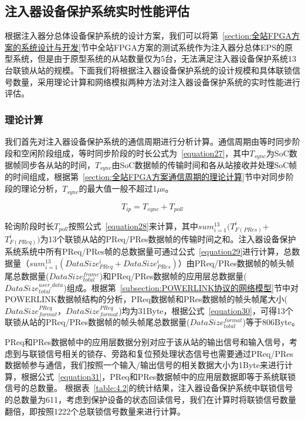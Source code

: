 \subsection{注入器设备保护系统实时性能评估}

根据注入器分总体设备保护系统的设计方案，我们可以将第~\ref{section:全站FPGA方案的系统设计与开发}节中全站FPGA方案的测试系统作为注入器分总体EPS的原型系统，但是由于原型系统的从站数量仅为5台，无法满足注入器设备保护系统13台联锁从站的规模。下面我们将根据注入器设备保护系统的设计规模和具体联锁信号数量，采用理论计算和网络模拟两种方法对注入器设备保护系统的实时性能进行评估。

\subsubsection{理论计算}

我们首先对注入器设备保护系统的通信周期进行分析计算。通信周期由等时同步阶段和空闲阶段组成，等时同步阶段的时长公式为~\ref{equation27}，其中$T_{sync}$为SoC数据帧同步各从站的时间，$T_{sync}$由SoC数据帧的传输时间和各从站接收并处理SoC帧的时间组成，根据第~\ref{section:全站FPGA方案通信周期的理论计算}节中对同步阶段的理论分析，$T_{sync}$的最大值一般不超过1$\mu$s。

\begin{equation}
\label{equation27}
T_{ip}=T_{sync}+T_{poll}
\end{equation}

轮询阶段时长$T_{poll}$按照公式~\ref{equation28}来计算，其中$sum_{i=1}^{13}(T_{F(PRes)}^{i}$+$T_{F(PReq)}^{i})$为13个联锁从站的PReq/PRes数据帧的传输时间之和。注入器设备保护系统系统中所有PReq/PRes帧的总数据量可通过公式~\ref{equation29}进行计算，总数据量（$sum_{i=1}^{13}(DataSize_{PReq}^{i}+DataSize_{PRes}^{i})$）由PReq/PRes数据帧的帧头帧尾总数据量($DataSize_{total}^{frame}$)和PReq/PRes数据帧的应用层总数据量($DataSize_{total}^{user\_data}$)组成。根据第~\ref{subsection:POWERLINK协议的网络模型}节中对POWERLINK数据帧结构的分析，PReq数据帧和PRes数据帧的帧头帧尾大小($DataSize_{format}^{PReq}$，$DataSize_{format}^{PReq}$)均为31Byte，根据公式~\ref{equation30}，可得13个联锁从站的PReq/PRes数据帧的帧头帧尾总数据量($DataSize_{total}^{format}$)等于806Byte。

PReq和PRes数据帧中的应用层数据分别对应于该从站的输出信号和输入信号，考虑到与联锁信号相关的锁存、旁路和复位预处理状态信号也需要通过PReq/PRes数据帧参与通信，我们按照一个输入/输出信号的相关数据大小为1Byte来进行计算，根据公式~\ref{equation31}，PReq和PRes数据帧中的应用层数据即等于系统联锁信号的总数量。
根据表~\ref{table:4.2}的统计结果，注入器设备保护系统中联锁信号的总数量为611，考虑到保护设备的状态回读信号，我们在计算时将联锁信号数量翻倍，即按照1222个总联锁信号数量来进行计算。


